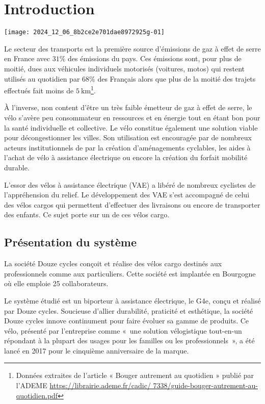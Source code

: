 \section{Introduction}

\begin{center}
\texttt{[image: 2024\_12\_06\_8b2ce2e701dae8972925g-01]}
\end{center}


Le secteur des transports est la première source d'émissions de gaz à effet de serre en France avec \(31 \%\) des émissions du pays. Ces émissions sont, pour plus de moitié, dues aux véhicules individuels motorisés (voitures, motos) qui restent utilisés au quotidien par \(68 \%\) des Français alors que plus de la moitié des trajets effectués fait moins de \(5 \mathrm{~km}\)\footnote{Données extraites de l’article « Bouger autrement au quotidien » publié par l’ADEME  \url{https://librairie.ademe.fr/cadic/
7338/guide-bouger-autrement-au-quotidien.pdf}}.

À l'inverse, non content d'être un très faible émetteur de gaz à effet de serre, le vélo s'avère peu consommateur en ressources et en énergie tout en étant bon pour la santé individuelle et collective. Le vélo constitue également une solution viable pour décongestionner les villes. Son utilisation est encouragée par de nombreux acteurs institutionnels de par la création d'aménagements cyclables, les aides à l'achat de vélo à assistance électrique ou encore la création du forfait mobilité durable.

L'essor des vélos à assistance électrique (VAE) a libéré de nombreux cyclistes de l'appréhension du relief. Le développement des VAE s'est accompagné de celui des vélos cargos qui permettent d'effectuer des livraisons ou encore de transporter des enfants. Ce sujet porte sur un de ces vélos cargo.

\subsection{Présentation du système}

La société Douze cycles conçoit et réalise des vélos cargo destinés aux professionnels comme aux particuliers. Cette société est implantée en Bourgogne où elle emploie 25 collaborateurs.

Le système étudié est un biporteur à assistance électrique, le G4e, conçu et réalisé par Douze cycles. Soucieuse d'allier durabilité, praticité et esthétique, la société Douze cycles innove continument pour faire évoluer sa gamme de produits. Ce vélo, présenté par l'entreprise comme «~une solution vélogistique tout-en-un répondant à la plupart des usages pour les familles ou les professionnels~», a été lancé en 2017 pour le cinquième anniversaire de la marque.

